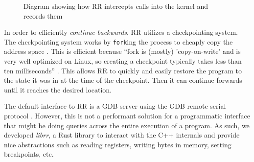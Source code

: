 \begin{figure}
\centering
{}
\caption{Diagram showing how RR intercepts calls into the kernel and records them}
\end{figure}


    In order to efficiently \textit{continue-backwards}, RR utilizes a checkpointing system. The checkpointing system works by \texttt{fork}ing the process to cheaply copy the address space \cite[p.~15]{rr}. This is efficient because ``fork is (mostly) 'copy-on-write' and is very well optimized on Linux, so creating a checkpoint typically takes less than ten milliseconds'' \cite[p.~15]{rr}. This allows RR to quickly and easily restore the program to the state it was in at the time of the checkpoint. Then it can continue-forwards until it reaches the desired location.

The default interface to RR is a GDB server using the GDB remote serial protocol \cite{gdb-proto}. However, this is not a performant solution for a programmatic interface that might be doing queries across the entire execution of a program. As such, we developed \textit{librr}, a Rust library to interact with the C++ internals and provide nice abstractions such as reading registers, writing bytes in memory, setting breakpoints, etc. 



